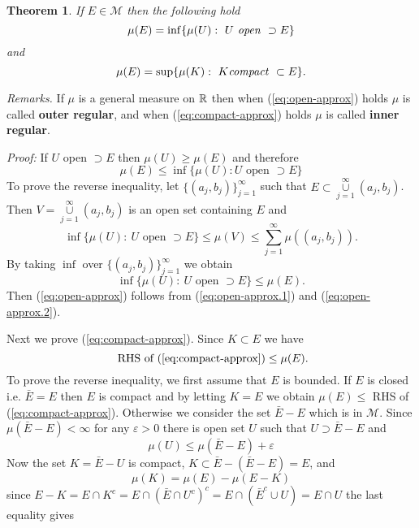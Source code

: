 \documentclass[12pt]{report}
\newtheorem{theorem}{Theorem}[section]
\begin{document}
\begin{theorem}  If $E \in \mathcal{M}$ then the following hold
\begin{equation}\label{eq:open-approx} 
\mu(E) = \inf \{\mu(U):\ U \mbox{\textit{ open} } \supset
E\}
\end{equation}
and
\begin{equation}\label{eq:compact-approx} 
\mu (E) = \sup \{\mu (K): \ K \mbox{\textit{compact} } \subset E\}.
\end{equation}
\end{theorem}
\textit{Remarks.}  
If $\mu$ is a general measure on $\Bbb R$ then when
(\ref{eq:open-approx}) holds
$\mu$ is called {\bf  outer regular}, and when (\ref{eq:compact-approx}) 
holds $\mu$ is called
{\bf  inner regular}.

\bigskip
\noindent
\textit{Proof:}  If $U$ open $\supset E$ then $\mu(U) \ge \mu(E)$ and
therefore
\begin{equation}\label{eq:open-approx.1}
\mu(E) \le \inf \{\mu(U):  U\mbox{ open  } \supset E \}
\end{equation} 
To prove the reverse inequality, let $\{(a_j,
b_j)\}^\infty_{j=1}$ such that $E
\subset\overset{\infty}{\underset{j=1}{\cup}}  (a_j, b_j)$.  Then $V =
\overset{\infty}{\underset{j=1}{\cup}}  (a_j, b_j)$ is an open set containing
$E$ and
\[
\inf\{\mu(U): \ U \mbox{ open } \supset E\} \le \mu(V) \le
\sum^\infty_{j=1}
\mu((a_j, b_j)).
\] By taking $\inf$ over $\{(a_j, b_j)\}^\infty_{j=1}$ we obtain
\begin{equation}\label{eq:open-approx.2}
\inf \{\mu(U): \ U \mbox{ open } \supset E\} \le \mu(E).
\end{equation}
Then  (\ref{eq:open-approx}) follows from (\ref{eq:open-approx.1}) and
(\ref{eq:open-approx.2}).

\bigskip
\noindent Next we prove (\ref{eq:compact-approx}).  Since $K \subset
E$ we have
\begin{equation}\label{eq:compact-approx.1}
\mbox{ RHS of (\ref{eq:compact-approx})} \le \mu(E).
\end{equation} 
To prove the reverse inequality, we first assume that $E$
is bounded.  If $E$ is closed i.e. $\bar E = E$ then $E$ is compact and by
letting $K = E$ we obtain
$\mu(E)
\le $ RHS of (\ref{eq:compact-approx}).  Otherwise we consider the set
$\bar E - E$ which is in
$\mathcal{M}$.  Since $\mu(\bar E - E) < \infty$ for any $\varepsilon > 0$
there is open set $U$ such that $U \supset \bar E - E$ and 
\[
\mu(U) \le \mu(\bar E - E) + \varepsilon
\] Now the set $K = \bar E - U$ is compact, $ K \subset \bar E - (
\bar E - E) = E$, and
\[
\mu(K) = \mu(E) - \mu(E - K)
\] since $E - K = E \cap K^c = E \cap (\bar E \cap  U^c)^c = E \cap \left (
\bar E^c \cup U\right ) = E \cap U$ the last equality gives
\end{document}
